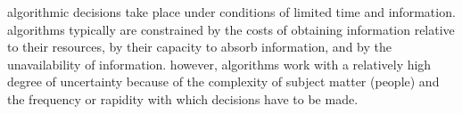 \documentclass[main]{subfiles}
\begin{document}
algorithmic decisions take place under conditions of limited time and information. algorithms typically are constrained by the costs of obtaining information relative to their resources, by their capacity to absorb information, and by the unavailability of information. however, algorithms work with a relatively high degree of uncertainty because of the complexity of subject matter (people) and the frequency or rapidity with which decisions have to be made.

\onlyinsubfile{
  
  
}
\end{document}
